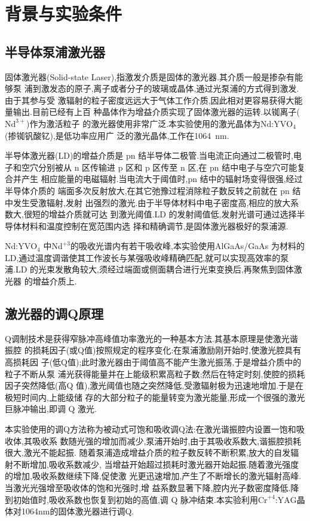 \documentclass[aps,pre,12pt,preprint,onecolumn,showpacs,showkeys]{revtex4-1}
\begin{document}
 
\section{背景与实验条件}

\subsection{半导体泵浦激光器}
 
固体激光器(Solid-state Laser),指激发介质是固体的激光器.其介质一般是掺杂有能够泵
浦到激发态的原子,离子或者分子的玻璃或晶体,通过光泵浦的方式得到激发.由于其参与受
激辐射的粒子密度远远大于气体工作介质,因此相对更容易获得大能量输出.目前已经有上百
种晶体作为增益介质实现了固体激光器的运转.以铷离子($\text{Nd}^{3+}$)作为激活粒子
的激光器使用非常广泛.本实验使用的激光晶体为$\text{Nd:YVO}_4$(掺铷钒酸钇),是低功率应用广
泛的激光晶体,工作在\SI{1064}{nm}.

半导体激光器(LD)的增益介质是 pn 结半导体二极管.当电流正向通过二极管时,电
子和空穴分别被从 n 区传输进 p 区和 p 区传至 n 区,在 pn 结中电子与空穴可能复合并产生
相应能量的电磁辐射.当电流大于阈值时,pn 结中的辐射场变得很强,经过半导体介质的
端面多次反射放大,在其它弛豫过程消除粒子数反转之前就在 pn 结中发生受激辐射,发射
出强烈的激光.由于半导体材料中电子密度高,相应的放大系数大,很短的增益介质就可达
到激光阈值.LD 的发射阈值低,发射光谱可通过选择半导体材料和温度控制在宽范围内选
择和精确调节,是固体激光器极好的泵浦源.

$\text{Nd:YVO}_4$ 中$\text{Nd}^{+3}$的吸收光谱内有若干吸收峰,本实验使用AlGaAs/GaAs
为材料的 LD,通过温度调谐使其工作波长与某强吸收峰精确匹配,就可以实现高效率的泵
浦.LD 的光束发散角较大,须经过端面或侧面耦合进行光束变换后,再聚焦到固体激光器
的增益介质上.\cite{Note}

\subsection{激光器的调Q原理}

Q调制技术是获得窄脉冲高峰值功率激光的一种基本方法.其基本原理是使激光谐振腔
的损耗因子(或Q值)按照规定的程序变化:在泵浦激励刚开始时,使激光腔具有高损耗因
子(低Q值);此时激光器由于阈值高不能产生激光振荡,于是增益介质中的粒子不断从泵
浦光获得能量并在上能级积累高粒子数;然后在特定时刻,使腔的损耗因子突然降低(高Q
值),激光阈值也随之突然降低,受激辐射极为迅速地增加.于是在极短时间内,上能级储
存的大部分粒子的能量转变为激光能量,形成一个很强的激光巨脉冲输出,即调 Q 激光.


本实验使用的调Q方法称为被动式可饱和吸收调Q法:在激光谐振腔内设置一饱和吸收体,其吸收系
数随光强的增加而减少,泵浦开始时,由于其吸收系数大,谐振腔损耗很大,激光不能起振.
随着泵浦造成增益介质的粒子数反转不断积累,放大的自发辐射不断增加,吸收系数减少,
当增益开始超过损耗时激光器开始起振.随着激光强度的增加,吸收系数继续下降,促使激
光更迅速增加,产生了不断增长的激光辐射高峰.当激光光强增至吸收体的饱和光强时,增
益系数显著下降,腔内光子数密度降低.降到初始值时,吸收系数也恢复到初始的高值,调
Q 脉冲结束.本实验利用$\text{Cr}^{+4}\text{:YAG}$晶体对1064nm的固体激光器进行调Q.
\cite{Note}
\end{document}
